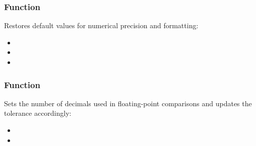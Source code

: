 \subsubsection{Function } %
\label{ssub:tkz_reset_defaults}

Restores default values for numerical precision and formatting:
\begin{itemize}
  \item {}
  \item {}
  \item {}
\end{itemize}

\subsubsection{Function } %
\label{ssub:tkz_set_nb_dec}


Sets the number of decimals used in floating-point comparisons and updates the tolerance accordingly:
\begin{itemize}
  \item {}
  \item {}
\end{itemize}
%
